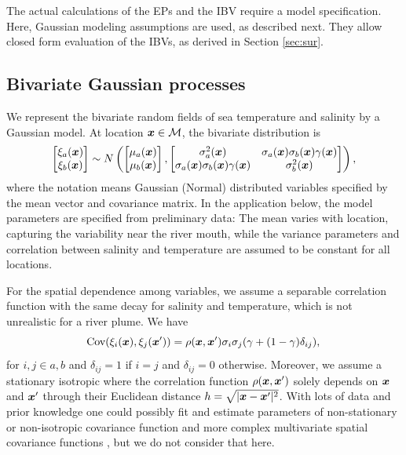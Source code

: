 \documentclass[aoas]{imsart}
\begin{document}
The actual calculations of the EPs and the IBV require a model
specification. Here, Gaussian modeling assumptions are used, as described next. They allow closed form evaluation of the IBVs, as derived in Section \ref{sec:sur}.  

\subsection{Bivariate Gaussian processes}

We represent the bivariate random fields of sea temperature and
salinity by a Gaussian model.  At location ${\boldsymbol x} \in \mathcal{M}$, the bivariate distribution is
\begin{equation}\label{gp_bar}
\begin{bmatrix}\xi_a(\bx) \\
\xi_b(\bx) 
\end{bmatrix}
 \sim N \left( 
\begin{bmatrix} \mu_{a}(\bx)\\
\mu_{b}(\bx)
\end{bmatrix},\begin{bmatrix}
\sigma_{a}^2(\bx) & \sigma_{a}(\bx) \sigma_b(\bx) \gamma(\bx)  \\
\sigma_{a}(\bx) \sigma_b(\bx) \gamma(\bx)  & \sigma_{b}^2(\bx) 
\end{bmatrix}
\right),
\end{equation}
where the notation means Gaussian (Normal) distributed variables specified by the mean vector and covariance matrix.
In the application below, the model parameters are specified from preliminary data: The mean varies with location, capturing the variability near the river mouth, while the variance parameters and correlation between salinity and
temperature are assumed to be constant for all locations. 

For the spatial dependence among variables, 
we assume a separable correlation function with the same decay for salinity and temperature,
which is not unrealistic for a river plume. We have
\begin{equation}\label{gp_corr}
\mbox{Cov}(\xi_i(\bx),\xi_j(\bx')) = \rho(\bx,\bx') \sigma_i \sigma_j (\gamma +(1-\gamma )\delta_{ij}), \\
\end{equation}
for $i,j \in {a,b}$ and $\delta_{ij}=1$ if $i=j$ and $\delta_{ij}=0$ otherwise.
Moreover, we assume a stationary isotropic where the correlation function
$\rho({\boldsymbol x},{\boldsymbol x}')$ solely depends on ${\boldsymbol x}$ and ${\boldsymbol x}'$ through their Euclidean distance $h=\sqrt{|{\boldsymbol x}-{\boldsymbol x}'|^2}$.
With lots of data and prior knowledge one could possibly fit and estimate parameters of non-stationary or non-isotropic covariance function and more complex multivariate spatial covariance functions
\citep{gneiting2010matern,genton2015cross}, but we do not consider that here.
\end{document}
